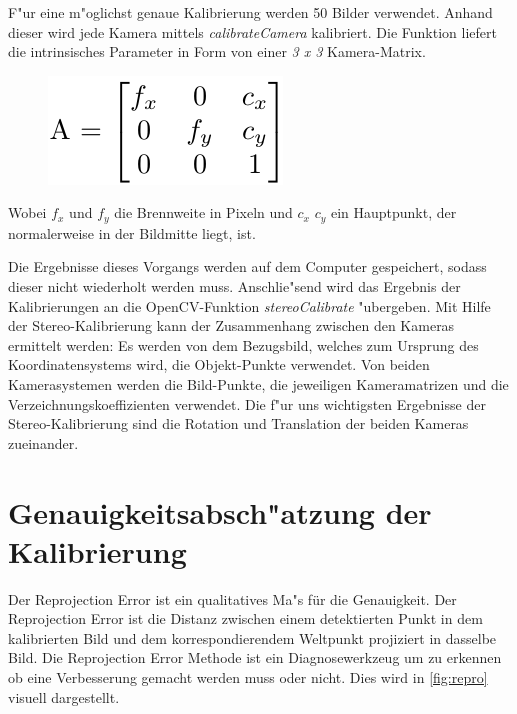 \noindent F"ur eine m"oglichst genaue Kalibrierung werden 50 Bilder verwendet. Anhand dieser wird jede Kamera mittels \textit{calibrateCamera} kalibriert.\newline
Die Funktion liefert die intrinsisches Parameter in Form von einer \textit{3 x 3} Kamera-Matrix.

\begin{figure}[H]
	\centering
	\includegraphics[scale=0.75]{bilder/matrix}
\end{figure}

\noindent Wobei $f_{x}$ und $f_{y}$ die Brennweite in Pixeln und $c_{x}$ $c_{y}$ ein Hauptpunkt, der normalerweise in der Bildmitte liegt, ist.

\noindent Die Ergebnisse dieses Vorgangs werden auf dem Computer gespeichert, sodass dieser nicht wiederholt werden muss. Anschlie"send wird das Ergebnis der Kalibrierungen an die OpenCV-Funktion \textit{stereoCalibrate} "ubergeben.\newline
Mit Hilfe der Stereo-Kalibrierung kann der Zusammenhang zwischen den Kameras ermittelt werden: Es werden von dem Bezugsbild, welches zum Ursprung des Koordinatensystems wird, die Objekt-Punkte verwendet. Von beiden Kamerasystemen werden die Bild-Punkte, die jeweiligen Kameramatrizen und die Verzeichnungskoeffizienten verwendet. Die f"ur uns wichtigsten Ergebnisse der Stereo-Kalibrierung sind die Rotation und Translation der beiden Kameras zueinander.

\section{Genauigkeitsabsch"atzung der Kalibrierung}
\label{sec:fehlertest}

Der Reprojection Error ist ein qualitatives Ma"s für die Genauigkeit. Der Reprojection Error ist die Distanz zwischen einem detektierten Punkt in dem kalibrierten Bild und dem korrespondierendem Weltpunkt projiziert in dasselbe Bild. Die Reprojection Error Methode ist ein Diagnosewerkzeug um zu erkennen ob eine Verbesserung gemacht werden muss oder nicht. Dies wird in \ref{fig:repro} visuell dargestellt.

